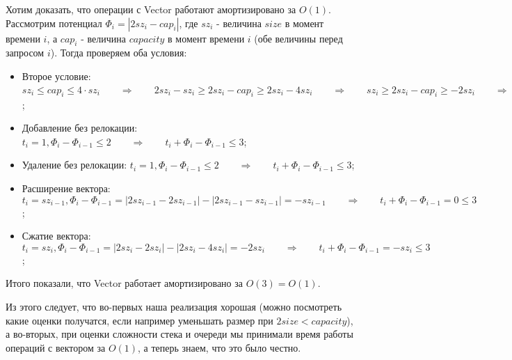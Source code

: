 Хотим доказать, что операции с Vector работают амортизировано за $O(1)$. Рассмотрим потенциал $\Phi_i = |2sz_i - cap_i|$, где $sz_i$ - величина $size$ в момент времени $i$, а $cap_i$ - величина $capacity$ в момент времени $i$ (обе величины перед запросом $i$). Тогда проверяем оба условия:
\begin{itemize}
    \item Второе условие: $sz_i \leq cap_i \leq 4 \cdot sz_i \qquad \Rightarrow \qquad 2sz_i - sz_i \geq 2sz_i - cap_i \geq 2sz_i - 4 sz_i \qquad \Rightarrow \qquad sz_i \geq 2sz_i - cap_i \geq -2sz_i \qquad \Rightarrow \qquad 0 \leq \Phi_i = |2sz_i - cap_i| \leq 2sz_i \leq 2i \leq 3 q$;
    \item Добавление без релокации: $t_i = 1, \Phi_i - \Phi_{i-1} \leq 2 \qquad \Rightarrow \qquad t_i + \Phi_i - \Phi_{i-1} \leq 3$;
    \item Удаление без релокации: $t_i = 1, \Phi_i - \Phi_{i-1} \leq 2 \qquad \Rightarrow \qquad t_i + \Phi_i - \Phi_{i-1} \leq 3$;
    \item Расширение вектора: $t_i = sz_{i-1}, \Phi_i - \Phi_{i-1} = |2sz_{i-1} - 2sz_{i-1}| - |2sz_{i-1} - sz_{i-1}| = -sz_{i-1} \qquad \Rightarrow \qquad t_i + \Phi_i - \Phi_{i-1} = 0 \leq 3$;
    \item Сжатие вектора: $t_i = sz_i, \Phi_i - \Phi_{i-1} = |2sz_i - 2sz_i| - |2sz_i - 4sz_i| = -2sz_i \qquad \Rightarrow \qquad t_i + \Phi_i - \Phi_{i-1} = -sz_i \leq 3$;
\end{itemize}

Итого показали, что Vector работает амортизировано за $O(3) = O(1)$.

Из этого следует, что во-первых наша реализация хорошая (можно посмотреть какие оценки получатся, если например уменьшать размер при $2size < capacity$), а во-вторых, при оценки сложности стека и очереди мы принимали время работы операций с вектором за $O(1)$, а теперь знаем, что это было честно.
